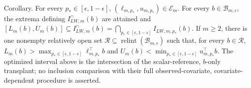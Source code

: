 Corollary. For every \(p_*\in[\epsilon,1-\epsilon]\), \((\ell_{m,p_*},u_{m,p_*})\in\mathcal E_m\). For every \(b\in\mathcal B_{m,\epsilon}\), the extrema defining \(I_{LW,m}^{\cap}(b)\) are attained and \([L_m(b),U_m(b)]\subseteq I_{LW,m}^{\cap}(b)=\bigcap_{p_*\in[\epsilon,1-\epsilon]}I_{LW,m,p_*}(b)\). If \(m\ge2\), there is one nonempty relatively open set \(\mathcal R\subseteq\operatorname{relint}(\mathcal B_{m,\epsilon})\) such that, for every \(b\in\mathcal R\), \(L_m(b)>\max_{p_*\in[\epsilon,1-\epsilon]}\ell_{m,p_*}^{\top}b\) and \(U_m(b)<\min_{p_*\in[\epsilon,1-\epsilon]}u_{m,p_*}^{\top}b\). The optimized interval above is the intersection of the scalar-reference, \(b\)-only transplant; no inclusion comparison with their full observed-covariate, covariate-dependent procedure is asserted.